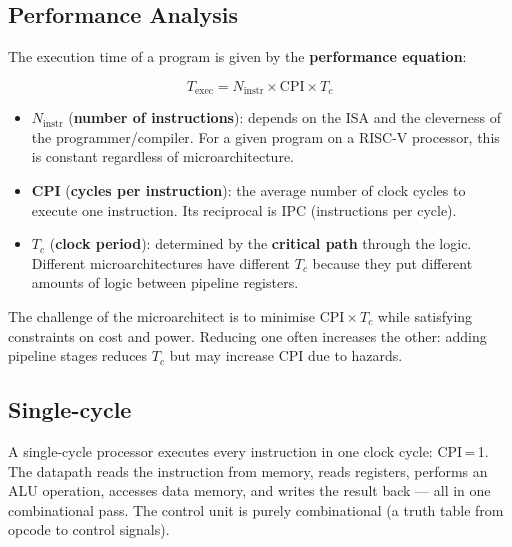 \documentclass[9pt, a4paper]{extarticle}
\begin{document}
\subsection{Performance Analysis}

The execution time of a program is given by the \textbf{performance equation}:

$$
T_{\text{exec}} = N_{\text{instr}} \times \text{CPI} \times T_c
$$

\begin{itemize}
    \item $N_{\text{instr}}$ (\textbf{number of instructions}): depends on the ISA and the cleverness of the programmer/compiler. For a given program on a RISC-V processor, this is constant regardless of microarchitecture.
    \item \textbf{CPI} (\textbf{cycles per instruction}): the average number of clock cycles to execute one instruction. Its reciprocal is IPC (instructions per cycle).
    \item $T_c$ (\textbf{clock period}): determined by the \textbf{critical path} through the logic. Different microarchitectures have different $T_c$ because they put different amounts of logic between pipeline registers.
\end{itemize}

The challenge of the microarchitect is to minimise $\text{CPI} \times T_c$ while satisfying constraints on cost and power. Reducing one often increases the other: adding pipeline stages reduces $T_c$ but may increase CPI due to hazards.


\subsection{Single-cycle}

A single-cycle processor executes every instruction in one clock cycle: CPI\,=\,1. The datapath reads the instruction from memory, reads registers, performs an ALU operation, accesses data memory, and writes the result back --- all in one combinational pass. The control unit is purely combinational (a truth table from opcode to control signals).
\end{document}
